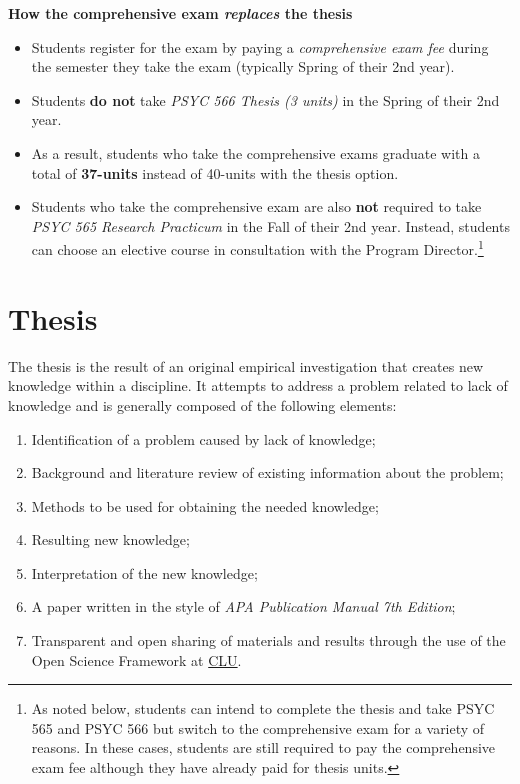 \documentclass[
  openany]{book}
\providecommand{\tightlist}{%
  \setlength{\itemsep}{0pt}\setlength{\parskip}{0pt}}
\begin{document}
\textbf{How the comprehensive exam \emph{replaces} the thesis}

\begin{itemize}
\tightlist
\item
  Students register for the exam by paying a \emph{comprehensive exam fee} during the semester they take the exam (typically Spring of their 2nd year).
\item
  Students \textbf{do not} take \emph{PSYC 566 Thesis (3 units)} in the Spring of their 2nd year.\\
\item
  As a result, students who take the comprehensive exams graduate with a total of \textbf{37-units}
  instead of 40-units with the thesis option.
\item
  Students who take the comprehensive exam are also \textbf{not} required to take \emph{PSYC 565 Research Practicum} in the Fall of their 2nd year. Instead, students can choose an elective course in consultation with the Program Director.\footnote{As noted below, students can intend to complete the thesis and take PSYC 565 and PSYC 566 but switch to the comprehensive exam for a variety of reasons. In these cases, students are still required to pay the comprehensive exam fee although they have already paid for thesis units.}
\end{itemize}

\hypertarget{thesis}{%
\section{Thesis}\label{thesis}}

The thesis is the result of an original empirical investigation that creates new knowledge within a discipline. It attempts to address a problem related to lack of knowledge and is generally composed of the following elements:

\begin{enumerate}
\def\labelenumi{\arabic{enumi}.}
\tightlist
\item
  Identification of a problem caused by lack of knowledge;
\item
  Background and literature review of existing information about the problem;
\item
  Methods to be used for obtaining the needed knowledge;
\item
  Resulting new knowledge;
\item
  Interpretation of the new knowledge;
\item
  A paper written in the style of \emph{APA Publication Manual 7th Edition};
\item
  Transparent and open sharing of materials and results through the use of the Open Science Framework at \href{https://accounts.osf.io/login?campaign=institution\&service=https\%3A\%2F\%2Fosf.io\%2Flogin\%2F\%3Fnext\%3Dhttps\%253A\%252F\%252Fosf.io\%252F}{CLU}.
\end{enumerate}
\end{document}
